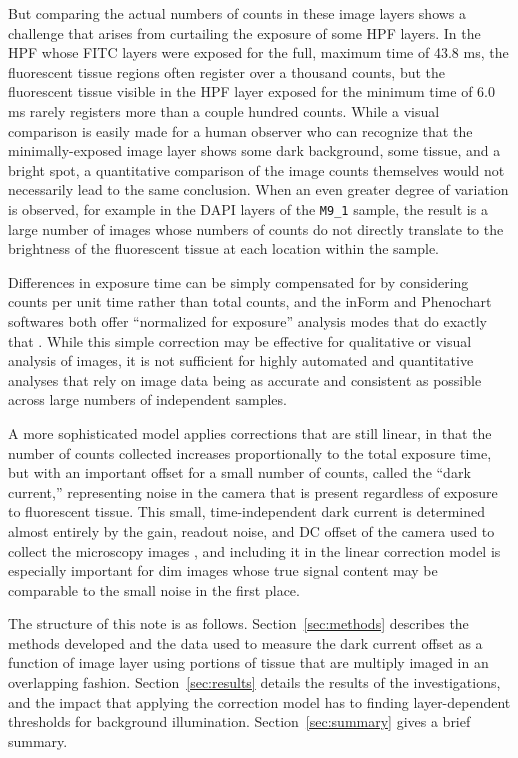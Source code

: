 \documentclass[letterpaper,11pt]{article}
\newcommand{\refsec}[1]{Section~\ref{#1}}
\begin{document}
But comparing the actual numbers of counts in these image layers shows a challenge that arises from curtailing the exposure of some HPF layers. In the HPF whose FITC layers were exposed for the full, maximum time of 43.8 ms, the fluorescent tissue regions often register over a thousand counts, but the fluorescent tissue visible in the HPF layer exposed for the minimum time of 6.0 ms rarely registers more than a couple hundred counts. While a visual comparison is easily made for a human observer who can recognize that the minimally-exposed image layer shows some dark background, some tissue, and a bright spot, a quantitative comparison of the image counts themselves would not necessarily lead to the same conclusion. When an even greater degree of variation is observed, for example in the DAPI layers of the \texttt{M9\_1} sample, the result is a large number of images whose numbers of counts do not directly translate to the brightness of the fluorescent tissue at each location within the sample.

Differences in exposure time can be simply compensated for by considering counts per unit time rather than total counts, and the inForm and Phenochart softwares both offer ``normalized for exposure'' analysis modes that do exactly that \cite{inform_user_manual,phenochart_user_manual}. While this simple correction may be effective for qualitative or visual analysis of images, it is not sufficient for highly automated and quantitative analyses that rely on image data being as accurate and consistent as possible across large numbers of independent samples. 

A more sophisticated model applies corrections that are still linear, in that the number of counts collected increases proportionally to the total exposure time, but with an important offset for a small number of counts, called the ``dark current,'' representing noise in the camera that is present regardless of exposure to fluorescent tissue. This small, time-independent dark current is determined almost entirely by the gain, readout noise, and DC offset of the camera used to collect the microscopy images \cite{doi:10.1111/j.1365-2818.2011.03581.x}, and including it in the linear correction model is especially important for dim images whose true signal content may be comparable to the small noise in the first place.

The structure of this note is as follows. \refsec{sec:methods} describes the methods developed and the data used to measure the dark current offset as a function of image layer using portions of tissue that are multiply imaged in an overlapping fashion. \refsec{sec:results} details the results of the investigations, and the impact that applying the correction model has to finding layer-dependent thresholds for background illumination. \refsec{sec:summary} gives a brief summary.
\end{document}
